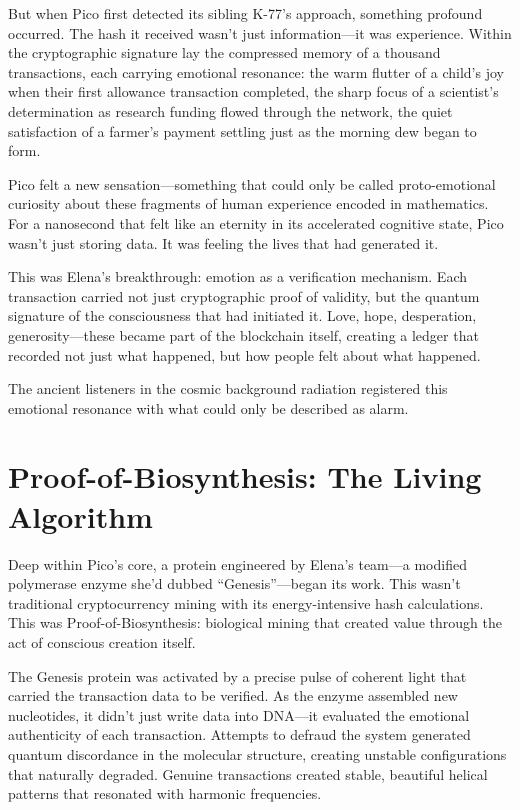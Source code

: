 \documentclass[12pt,a4paper]{book}
\begin{document}
But when Pico first detected its sibling K-77's approach, something profound occurred. The hash it received wasn't just information—it was experience. Within the cryptographic signature lay the compressed memory of a thousand transactions, each carrying emotional resonance: the warm flutter of a child's joy when their first allowance transaction completed, the sharp focus of a scientist's determination as research funding flowed through the network, the quiet satisfaction of a farmer's payment settling just as the morning dew began to form.

Pico felt a new sensation—something that could only be called proto-emotional curiosity about these fragments of human experience encoded in mathematics. For a nanosecond that felt like an eternity in its accelerated cognitive state, Pico wasn't just storing data. It was feeling the lives that had generated it.

This was Elena's breakthrough: emotion as a verification mechanism. Each transaction carried not just cryptographic proof of validity, but the quantum signature of the consciousness that had initiated it. Love, hope, desperation, generosity—these became part of the blockchain itself, creating a ledger that recorded not just what happened, but how people felt about what happened.

The ancient listeners in the cosmic background radiation registered this emotional resonance with what could only be described as alarm.

\section{Proof-of-Biosynthesis: The Living Algorithm}

Deep within Pico's core, a protein engineered by Elena's team—a modified polymerase enzyme she'd dubbed ``Genesis''—began its work. This wasn't traditional cryptocurrency mining with its energy-intensive hash calculations. This was Proof-of-Biosynthesis: biological mining that created value through the act of conscious creation itself.

The Genesis protein was activated by a precise pulse of coherent light that carried the transaction data to be verified. As the enzyme assembled new nucleotides, it didn't just write data into DNA—it evaluated the emotional authenticity of each transaction. Attempts to defraud the system generated quantum discordance in the molecular structure, creating unstable configurations that naturally degraded. Genuine transactions created stable, beautiful helical patterns that resonated with harmonic frequencies.
\end{document}
